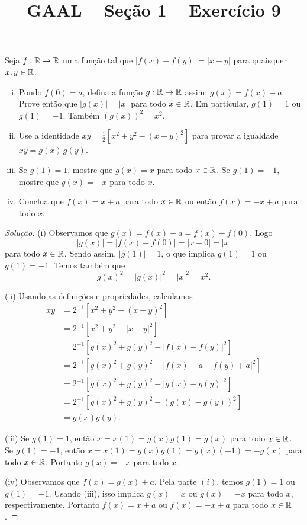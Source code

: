 \documentclass[a4paper,11pt]{article}
\title{GAAL -- Seção 1 -- Exercício 9}
\author{\empty}
\date{\empty}
\newcommand\onlyinsubfileone\maketitle
\begin{document}
\onlyinsubfileone

\begin{exercicio-gaal}[E9.S1]
  Seja $f : \mathbb{R} \to \mathbb{R}$ uma função tal que $|f(x)-f(y)| = |x-y|$ para quaisquer $x,y \in \mathbb{R}$.
  \begin{enumerate}[(i)]
    \item
      Pondo $f(0) = a$, defina a função $g : \mathbb{R} \to \mathbb{R}$ assim: $g(x) = f(x) - a$.
      Prove então que $|g(x)| = |x|$ para todo $x \in \mathbb{R}$.
      Em particular, $g(1) = 1$ ou $g(1) = -1$.
      Também $(g(x))^2 = x^2$.
    \item
      Use a identidade $xy = \frac{1}{2}[ x^2 + y^2 - (x-y)^2 ]$ para provar a igualdade $xy = g(x)\,g(y)$.
    \item
      Se $g(1) = 1$, mostre que $g(x) = x$ para todo $x \in \mathbb{R}$.
      Se $g(1) = -1$, mostre que $g(x) = -x$ para todo $x$.
    \item
      Conclua que $f(x) = x + a$ para todo $x \in \mathbb{R}$ ou então $f(x) = -x + a$ para todo $x$.
  \end{enumerate}
\end{exercicio-gaal}

\begin{proof}[Solução]
  (i)
  Observamos que $g(x) = f(x) - a = f(x) - f(0)$.
  Logo
  \[
    |g(x)| = |f(x)-f(0)| = |x-0| = |x|
  \]
  para todo $x \in \mathbb{R}$.
  Sendo assim, $|g(1)| = 1$, o que implica $g(1) = 1$ ou $g(1) = -1$.
  Temos também que
  \[
    g(x)^2 = |g(x)|^2 = |x|^2 = x^2.
  \]

  (ii)
  Usando as definições e propriedades, calculamos
  \begin{align*}
    xy & = 2^{-1} [x^2 + y^2 - (x-y)^2 ] \\
    & = 2^{-1} [ x^2 + y^2 - |x-y|^2 ] \\
    & = 2^{-1} [ g(x)^2 + g(y)^2 - |f(x) - f(y)|^2 ] \\
    & = 2^{-1} [ g(x)^2 + g(y)^2 - |f(x) - a - f(y) + a|^2 ] \\
    & = 2^{-1} [ g(x)^2 + g(y)^2 - |g(x) - g(y)|^2 ] \\
    & = 2^{-1} [ g(x)^2 + g(y)^2 - (g(x) - g(y))^2 ] \\
    & = g(x)g(y).
  \end{align*}

  (iii)
  Se $g(1)=1$, então $x = x(1) = g(x)g(1) = g(x)$ para todo $x \in \mathbb{R}$.
  Se $g(1)=-1$, então $x = x(1) = g(x)g(1) = g(x)(-1) = -g(x)$ para todo $x \in \mathbb{R}$.
  Portanto $g(x) = -x$ para todo $x$.

  (iv)
  Observamos que $f(x) = g(x) + a$.
  Pela parte $(i)$, temos $g(1) = 1$ ou $g(1) = -1$.
  Usando (iii), isso implica $g(x)=x$ ou $g(x) = -x$ para todo $x$, respectivamente.
  Portanto $f(x) = x + a$ ou $f(x) = -x + a$ para todo $x \in \mathbb{R}$.
\end{proof}
\end{document}

